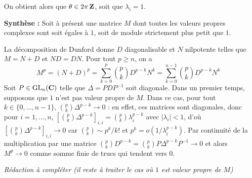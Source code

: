 \begin{correction}
\begin{itemize}
        On obtient alors que $\theta\in 2\pi\operatorname{\mathbf{Z}}$, soit que $\lambda_i=1$.
    \end{itemize}

    \textbf{Synthèse :} Soit à présent une matrice $M$ dont toutes les valeurs propres complexes sont soit égales à $1$,
    soit de module strictement plus petit que $1$.

    La décomposition de Dunford donne $D$ diagonalisable et $N$ nilpotente telles que $M=N+D$ et $ND=DN$.
    Pour tout $p\geq n$, on a 
    \[
        M^p=(N+D)^p=\sum_{k=0}^p\binom pkD^{p-k}N^k=\sum_{k=0}^{n-1}\binom pk D^{p-k}N^k   \tag*{(*)} 
    \]
    Soit $P\in\operatorname{\mathrm{GL}}_n(\operatorname{\mathbf{C}})$ telle que $\Delta=PDP^{-1}$ soit diagonale. 
    Dans un premier temps, supposons que $1$ n'est pas valeur propre de $M$.
    Dans ce cas, pour tout $k\in\lbrace0,\dots,n-1\rbrace$, $\binom pk\Delta^{p-k}\to 0$ : en effet,
    ces matrices sont diagonales, donc pour $i=1,\dots,n$, $\left[\binom pk\Delta^{p-k}\right]_{i,i}=\binom pk\lambda_i^{p-k}$ avec 
    $|\lambda_i|<1$, d'où $\left[\binom pk\Delta^{p-k}\right]_{i,i}\to 0$ car $\binom pk\sim p^k/k!$ et $p^k=o(1/\lambda_i^{p-k})$.
    Par continuité de la multiplication par une matrice $\binom pk D^{p-k}=\binom pkP\Delta^{p-k}P^{-1}\to 0$ et alors $M^p\to 0$ comme somme finie de trucs qui tendent vers $0$.

	\textit{Rédaction à compléter (il reste à traiter le cas où $1$ est valeur propre de $M$)}
	
	
\end{correction}

